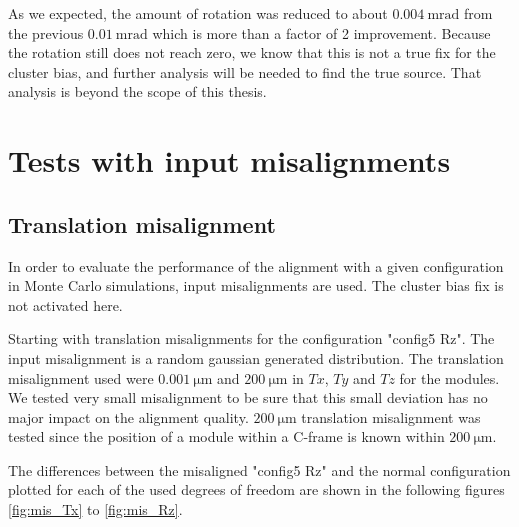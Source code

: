 As we expected, the amount of rotation was reduced to about
$\SI{0.004}{\milli\radian}$ from the previous $\SI{0.01}{\milli\radian}$ which is more than a factor of 2 improvement. Because the rotation still does not reach zero, we know that this is not a true fix for the cluster bias, and further analysis will be needed to find the true source. That analysis is beyond the scope of this thesis.

\section{Tests with input misalignments}
\label{sec:misalignment}
\subsection{Translation misalignment}
\label{sec:misT}

In order to evaluate the performance of the alignment with a given configuration in Monte Carlo simulations, input misalignments are used. The cluster bias fix is not activated here.

Starting with translation misalignments for the configuration "config5 Rz". The input misalignment is a random gaussian generated distribution. The translation misalignment used were $\SI{0.001}{\micro\metre}$ and $\SI{200}{\micro\metre}$ in $Tx$, $Ty$ and $Tz$ for the modules. We tested very small misalignment to be sure that this small deviation has no major impact on the alignment quality. $\SI{200}{\micro\metre}$ translation misalignment was tested since the position of a module within a C-frame is known within $\SI{200}{\micro\metre}$.

The differences between the misaligned "config5 Rz" and the normal configuration plotted for each of the used degrees of freedom are shown in the following figures \ref{fig:mis_Tx} to \ref{fig:mis_Rz}.

